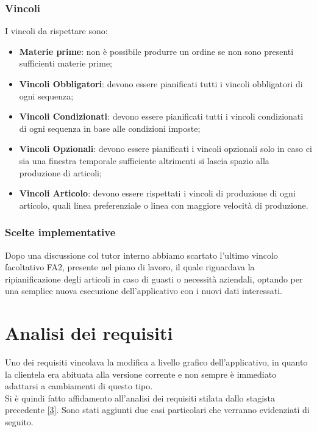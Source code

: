 \subsubsection{Vincoli}
I vincoli da rispettare sono:
\begin{itemize}
	
	\item \textbf{Materie prime}: non è possibile produrre un ordine se non sono presenti sufficienti materie prime;
	
	\item \textbf{Vincoli Obbligatori}: devono essere pianificati tutti i vincoli obbligatori di ogni sequenza;
	\item \textbf{Vincoli Condizionati}: devono essere pianificati tutti i vincoli condizionati di ogni sequenza in base alle condizioni imposte;
\item \textbf{Vincoli Opzionali}: devono essere pianificati i vincoli opzionali solo in caso ci sia una finestra temporale sufficiente altrimenti si lascia spazio alla produzione di articoli;
	\item \textbf{Vincoli Articolo}: devono essere rispettati i vincoli di produzione di ogni articolo, quali linea preferenziale o linea con maggiore velocità di produzione.
\end{itemize}

\subsubsection{Scelte implementative}
Dopo una discussione col tutor interno abbiamo scartato l'ultimo vincolo facoltativo FA2, presente nel piano di lavoro, il quale riguardava la ripianificazione
degli articoli in caso di guasti o necessità aziendali, optando per una semplice nuova esecuzione dell'applicativo con i nuovi dati interessati. 



\section{Analisi dei requisiti}

Uno dei requisiti vincolava la modifica a livello grafico dell'applicativo, in quanto la clientela era abituata alla versione corrente e non sempre
è immediato adattarsi a cambiamenti di questo tipo.\\ 
Si è quindi fatto affidamento all'analisi dei requisiti stilata dallo stagista precedente \hyperref[analisi-requisiti]{[3]}.
Sono stati aggiunti due casi particolari che verranno evidenziati di seguito.

